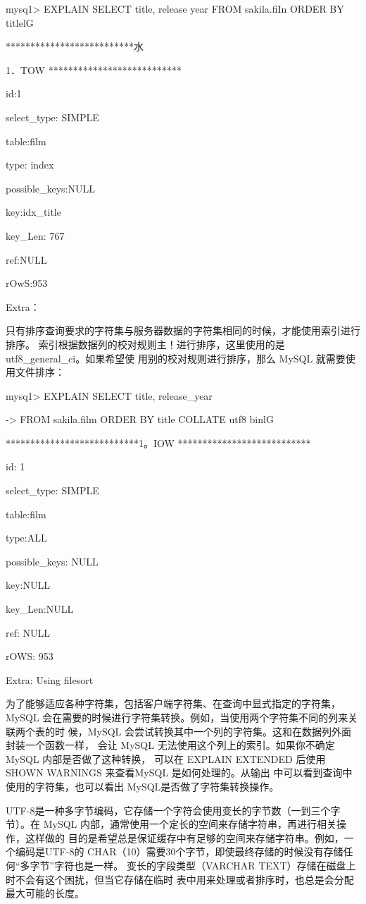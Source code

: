mysq1> EXPLAIN SELECT title, release year FROM sakila.fiIn ORDER BY titlelG

**************************水

1．TOW ***************************

id:1

select\_type: SIMPLE

table:film

type: index

possible\_keys:NULL

key:idx\_title

key\_Len: 767

ref:NULL

rOwS:953

Extra：

只有排序查询要求的字符集与服务器数据的字符集相同的时候，才能使用索引进行排序。
索引根据数据列的校对规则主！进行排序，这里使用的是 utf8\_general\_ci。如果希望使
用别的校对规则进行排序，那么 MySQL 就需要使用文件排序：

mysq1> EXPLAIN SELECT title, release\_year

-> FROM sakila.film ORDER BY title COLLATE utf8 binlG

***************************1。IOW ***************************

id: 1

select\_type: SIMPLE

table:film

type:ALL

possible\_keys: NULL

key:NULL

key\_Len:NULL

ref: NULL

rOWS: 953

Extra: Using filesort

为了能够适应各种字符集，包括客户端字符集、在查询中显式指定的字符集，MySQL
会在需要的时候进行字符集转换。例如，当使用两个字符集不同的列来关联两个表的时
候，MySQL 会尝试转换其中一个列的字符集。这和在数据列外面封装一个函数一样，
会让 MySQL 无法使用这个列上的索引。如果你不确定 MySQL 内部是否做了这种转换，
可以在 EXPLAIN EXTENDED 后使用SHOWN WARNINGS 来查看MySQL 是如何处理的。从输出
中可以看到查询中使用的字符集，也可以看出 MySQL是否做了字符集转换操作。

UTF-8是一种多字节编码，它存储一个字符会使用变长的字节数（一到三个字节）。在
MySQL 内部，通常使用一个定长的空间来存储字符串，再进行相关操作，这样做的
目的是希望总是保证缓存中有足够的空间来存储字符串。例如，一个编码是UTF-8的
CHAR（10）需要30个字节，即使最终存储的时候没有存储任何“多字节”字符也是一样。
变长的字段类型（VARCHAR TEXT）存储在磁盘上时不会有这个困扰，但当它存储在临时
表中用来处理或者排序时，也总是会分配最大可能的长度。

